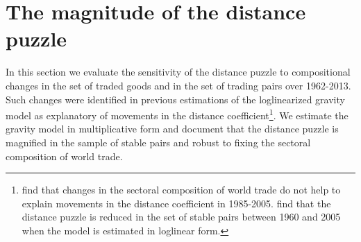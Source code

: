\documentclass[12pt,twoside,a4paper,notitlepage]{article}
\begin{document}


\section{The magnitude of the distance puzzle} \label{sec:part1} 
In this section we evaluate the sensitivity of the distance puzzle to compositional changes in the set of traded goods and in the set of trading pairs over 1962-2013.
Such changes were identified in previous estimations of the loglinearized gravity model as explanatory of movements in the distance coefficient\footnote{\cite{Berthelon2008} find that changes in the sectoral composition of world trade do not help to explain movements in the distance coefficient in 1985-2005.
\cite{Head2013} find that the distance puzzle is reduced in the set of stable pairs between 1960 and 2005 when the model is estimated in loglinear form.}.
We estimate the gravity model in multiplicative form and document that the distance puzzle is magnified in the sample of stable pairs and robust to fixing the sectoral composition of world trade.
\end{document}
